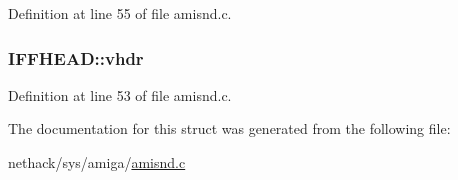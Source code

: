 Definition at line 55 of file amisnd.\+c.

\hypertarget{structIFFHEAD_a8382422ffd2bc6f1b004216fc140b9b5}{
\subsubsection[{vhdr}]{ I\+F\+F\+H\+E\+A\+D\+::vhdr}}\label{structIFFHEAD_a8382422ffd2bc6f1b004216fc140b9b5}


Definition at line 53 of file amisnd.\+c.



The documentation for this struct was generated from the following file\+:\begin{DoxyCompactItemize}
\item 
nethack/sys/amiga/\hyperlink{amisnd_8c}{amisnd.\+c}\end{DoxyCompactItemize}
